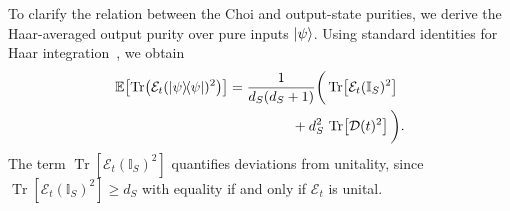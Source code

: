 \documentclass[pra,twocolumn,aps,showpacs,superscriptaddress,longbibliography]{revtex4-2}
\begin{document}

To clarify the relation between the Choi and output-state purities, we derive the Haar-averaged output purity over pure inputs $\ket{\psi}$. Using standard identities for Haar integration~\cite{mele_2024_introduction}, we obtain
\begin{equation}\label{eq:purity_relation}
\begin{split}
\mathbb{E}\!\left[\operatorname{Tr}\!\left(\mathcal{E}_t(\dyad{\psi})^2\right)\right]
&=\frac{1}{d_S(d_S+1)}\bigg(
\operatorname{Tr}\!\left[\mathcal{E}_t(\mathbb{I}_S)^2\right] \\
&\hspace{1.6cm} + d_S^2\,\operatorname{Tr}\!\left[\mathcal{D}(t)^2\right]
\bigg).
\end{split}
\end{equation}
The term $\operatorname{Tr}[\mathcal{E}_t(\mathbb{I}_S)^2]$ quantifies deviations from unitality, since $\operatorname{Tr}[\mathcal{E}_t(\mathbb{I}_S)^2]\ge d_S$ with equality if and only if $\mathcal{E}_t$ is unital.
\end{document}
